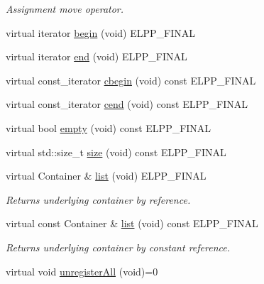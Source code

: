 \begin{DoxyCompactItemize}
\begin{DoxyCompactList}\small\item\em Assignment move operator. \end{DoxyCompactList}\item 
virtual iterator \hyperlink{classel_1_1base_1_1utils_1_1AbstractRegistry_a4ad971b1dddff996d327452d852e55b2}{begin} (void) E\+L\+P\+P\+\_\+\+F\+I\+N\+AL
\item 
virtual iterator \hyperlink{classel_1_1base_1_1utils_1_1AbstractRegistry_a67c40207c171f23ad50a71db819e84f9}{end} (void) E\+L\+P\+P\+\_\+\+F\+I\+N\+AL
\item 
virtual const\+\_\+iterator \hyperlink{classel_1_1base_1_1utils_1_1AbstractRegistry_a37f743184e808d7c0028e21e0d0898bb}{cbegin} (void) const E\+L\+P\+P\+\_\+\+F\+I\+N\+AL
\item 
virtual const\+\_\+iterator \hyperlink{classel_1_1base_1_1utils_1_1AbstractRegistry_ad3ee081b4b25c5d77f971f949bdb9158}{cend} (void) const E\+L\+P\+P\+\_\+\+F\+I\+N\+AL
\item 
virtual bool \hyperlink{classel_1_1base_1_1utils_1_1AbstractRegistry_a43ff6484b778c298416c482c07a4df3f}{empty} (void) const E\+L\+P\+P\+\_\+\+F\+I\+N\+AL
\item 
virtual std\+::size\+\_\+t \hyperlink{classel_1_1base_1_1utils_1_1AbstractRegistry_a58a7b8ea964bdf6008701dcfb6609ca5}{size} (void) const E\+L\+P\+P\+\_\+\+F\+I\+N\+AL
\item 
virtual Container \& \hyperlink{classel_1_1base_1_1utils_1_1AbstractRegistry_a072859d3728a75f910c2898f62fd12da}{list} (void) E\+L\+P\+P\+\_\+\+F\+I\+N\+AL\hypertarget{classel_1_1base_1_1utils_1_1AbstractRegistry_a072859d3728a75f910c2898f62fd12da}{}\label{classel_1_1base_1_1utils_1_1AbstractRegistry_a072859d3728a75f910c2898f62fd12da}

\begin{DoxyCompactList}\small\item\em Returns underlying container by reference. \end{DoxyCompactList}\item 
virtual const Container \& \hyperlink{classel_1_1base_1_1utils_1_1AbstractRegistry_a1c3da2af9177cbfae6f10b9e5dbe615c}{list} (void) const E\+L\+P\+P\+\_\+\+F\+I\+N\+AL\hypertarget{classel_1_1base_1_1utils_1_1AbstractRegistry_a1c3da2af9177cbfae6f10b9e5dbe615c}{}\label{classel_1_1base_1_1utils_1_1AbstractRegistry_a1c3da2af9177cbfae6f10b9e5dbe615c}

\begin{DoxyCompactList}\small\item\em Returns underlying container by constant reference. \end{DoxyCompactList}\item 
virtual void \hyperlink{classel_1_1base_1_1utils_1_1AbstractRegistry_a19223bc1fea48dbe6b47b4879aa4672f}{unregister\+All} (void)=0\hypertarget{classel_1_1base_1_1utils_1_1AbstractRegistry_a19223bc1fea48dbe6b47b4879aa4672f}{}\label{classel_1_1base_1_1utils_1_1AbstractRegistry_a19223bc1fea48dbe6b47b4879aa4672f}


\end{DoxyCompactItemize}
